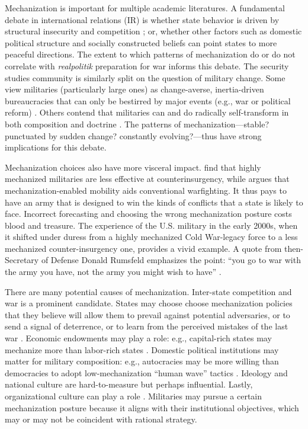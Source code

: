 \documentclass{article}
\begin{document}
Mechanization is important for multiple academic literatures. A
fundamental debate in international relations (IR) is whether state
behavior is driven by structural insecurity and 
competition \citep{waltz2001man, mearsheimer2001tragedy}; or, whether other
factors such as domestic political structure \citep{russett1994grasping} and
socially constructed beliefs \citep{wendt1992anarchy} can point states to more peaceful directions. 
The extent to which patterns of mechanization do or do not correlate with
\textit{realpolitik} preparation for war informs this debate.
The security studies community is similarly split on the question of military
change. Some view militaries (particularly large ones) as change-averse, 
inertia-driven bureaucracies that can only be bestirred by major events (e.g.,
war or political reform)
\citep{posen1986sources,zegart2000flawed,locher2004victory,halperin2007bureaucratic}. 
Others contend that militaries can and do radically self-transform in both composition and doctrine
\citep{murray1998military,adamsky2010culture}. The patterns of
mechanization---stable? punctuated by sudden change? constantly evolving?---thus
have strong implications for this debate.

Mechanization choices also have more visceral impact.
\citet{lyall2009rage} find that highly mechanized militaries are less effective
at counterinsurgency, while \citet{biddle2004military} argues that
mechanization-enabled mobility aids conventional warfighting. It thus
pays to have an army that is designed to win the kinds of conflicts that a state is 
likely to face. Incorrect forecasting and choosing the wrong mechanization
posture costs blood and treasure. The experience of the U.S. military in the early
2000s, when it shifted under duress from a highly mechanized Cold War-legacy force to a less
mechanized counter-insurgency one, provides a vivid example. A quote from then-Secretary of Defense 
Donald Rumsfeld emphasizes the point:
``you go to war with the army you have, not the army you might wish to have'' \citep{schmitt_2004}. 

There are many potential causes of mechanization. Inter-state
competition and war is a prominent candidate. States may choose choose mechanization policies 
that they believe will allow them to prevail against potential adversaries, or to send a
signal of deterrence, or to learn from the perceived mistakes of the last war
\citep{mearsheimer1983conventional,huth1988extended,murray2011military}. 
Economic endowments may play a role: e.g., capital-rich states may mechanize more
than labor-rich states \citep{gartzke2001democracy}. Domestic political
institutions may matter for military composition: e.g., autocracies may be more willing than democracies to adopt
low-mechanization ``human wave'' tactics
\citep{quinlivan1999coup,reiter2002democracies,brooks2008shaping,talmadge2015dictator}. 
Ideology \citep{van1984cult} and national culture \citep[e.g.][]{pollack2004arabs} are
hard-to-measure but perhaps influential. Lastly,
organizational culture can play a role \citep{builder1989masks}. Militaries may pursue a
certain mechanization posture because it aligns with their institutional
objectives, which may or may not be coincident with rational strategy. 
\end{document}
